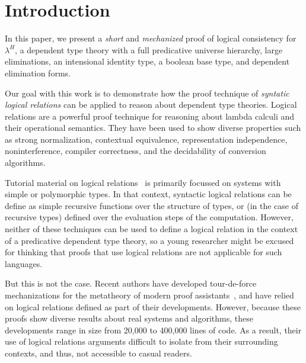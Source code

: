 \documentclass[acmsmall,screen=true,
\ifpublic review=false\else,review=true\fi
  ,anonymous=\ifanonymous true\else false\fi]{acmart}
\newcommand{\lang}{$\lambda^H$\xspace}
\newcommand{\scw}[1]{}
\begin{document}
\maketitle

\section{Introduction}
In this paper, we present a \emph{short} and \emph{mechanized} proof of
logical consistency for \lang{}, a dependent type theory with a full
predicative universe hierarchy, large eliminations, an intensional identity
type, a boolean base type, and dependent elimination forms.

Our goal with this work is to demonstrate how the proof technique of
\emph{syntatic logical relations} can be applied to reason about dependent
type theories.  Logical relations are a powerful proof technique for reasoning
about lambda calculi and their operational semantics. They have been used to
show diverse properties such as strong normalization, contextual equivalence,
representation independence, noninterference, compiler correctness, and the
decidability of conversion algorithms. \scw{add citations? emphasize that we are working
with syntactic logical relations.}

Tutorial material on logical relations~\citep{skorstengaard2019introduction,
  harpertait, harperkripke, pierce2002types,
  pierce2004advanced,harper2016practical} is primarily focussed on systems
with simple or polymorphic types. In that context, syntactic logical relations
can be define as simple recursive functions over the structure of types, or
(in the case of recursive types) defined over the evaluation steps of the
computation. However, neither of these techniques can be used to define a
logical relation in the context of a predicative dependent type theory, so a
young researcher might be excused for thinking that proofs that use logical
relations are not applicable for such languages.

But this is not the case. \scw{Add a sentence about pen-and-paper LR proofs for dependent type theories}
Recent authors have developed tour-de-force
mechanizations for the metatheory of modern proof
assistants~\citep{nbeincoq,decagda,martin-lof-a-la-coq,anand2014towards}, and
have relied on logical relations defined as part of their
developments. However, because these proofs show diverse results about real
systems and algorithms, these developments range in size from 20,000 to
400,000 lines of code. As a result, their use of logical relations arguments
difficult to isolate from their surrounding contexts, and thus, not accessible
to casual readers.
\end{document}
